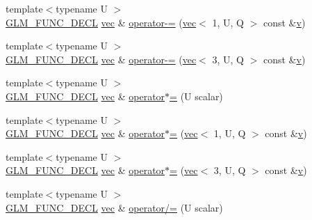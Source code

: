 \begin{DoxyCompactItemize}
\item 
{\footnotesize template$<$typename U $>$ }\\\hyperlink{setup_8hpp_ab2d052de21a70539923e9bcbf6e83a51}{G\+L\+M\+\_\+\+F\+U\+N\+C\+\_\+\+D\+E\+CL} \hyperlink{structglm_1_1vec}{vec} \& \hyperlink{structglm_1_1vec_3_013_00_01_t_00_01_q_01_4_a9b8dba9adb57ad50b1f22fdf3864407e}{operator-\/=} (\hyperlink{structglm_1_1vec}{vec}$<$ 1, U, Q $>$ const \&\hyperlink{_s_d_l__opengl_8h_a10a82eabcb59d2fcd74acee063775f90}{v})
\item 
{\footnotesize template$<$typename U $>$ }\\\hyperlink{setup_8hpp_ab2d052de21a70539923e9bcbf6e83a51}{G\+L\+M\+\_\+\+F\+U\+N\+C\+\_\+\+D\+E\+CL} \hyperlink{structglm_1_1vec}{vec} \& \hyperlink{structglm_1_1vec_3_013_00_01_t_00_01_q_01_4_af172872e811a8262f44dc83a9784354e}{operator-\/=} (\hyperlink{structglm_1_1vec}{vec}$<$ 3, U, Q $>$ const \&\hyperlink{_s_d_l__opengl_8h_a10a82eabcb59d2fcd74acee063775f90}{v})
\item 
{\footnotesize template$<$typename U $>$ }\\\hyperlink{setup_8hpp_ab2d052de21a70539923e9bcbf6e83a51}{G\+L\+M\+\_\+\+F\+U\+N\+C\+\_\+\+D\+E\+CL} \hyperlink{structglm_1_1vec}{vec} \& \hyperlink{structglm_1_1vec_3_013_00_01_t_00_01_q_01_4_aba701d21d6bd3d13abf30c01af0578a5}{operator$\ast$=} (U scalar)
\item 
{\footnotesize template$<$typename U $>$ }\\\hyperlink{setup_8hpp_ab2d052de21a70539923e9bcbf6e83a51}{G\+L\+M\+\_\+\+F\+U\+N\+C\+\_\+\+D\+E\+CL} \hyperlink{structglm_1_1vec}{vec} \& \hyperlink{structglm_1_1vec_3_013_00_01_t_00_01_q_01_4_ab92a53416987503f1fcf90654e0512fd}{operator$\ast$=} (\hyperlink{structglm_1_1vec}{vec}$<$ 1, U, Q $>$ const \&\hyperlink{_s_d_l__opengl_8h_a10a82eabcb59d2fcd74acee063775f90}{v})
\item 
{\footnotesize template$<$typename U $>$ }\\\hyperlink{setup_8hpp_ab2d052de21a70539923e9bcbf6e83a51}{G\+L\+M\+\_\+\+F\+U\+N\+C\+\_\+\+D\+E\+CL} \hyperlink{structglm_1_1vec}{vec} \& \hyperlink{structglm_1_1vec_3_013_00_01_t_00_01_q_01_4_a6ac07056cd1518270e77cdcce4fb3fe5}{operator$\ast$=} (\hyperlink{structglm_1_1vec}{vec}$<$ 3, U, Q $>$ const \&\hyperlink{_s_d_l__opengl_8h_a10a82eabcb59d2fcd74acee063775f90}{v})
\item 
{\footnotesize template$<$typename U $>$ }\\\hyperlink{setup_8hpp_ab2d052de21a70539923e9bcbf6e83a51}{G\+L\+M\+\_\+\+F\+U\+N\+C\+\_\+\+D\+E\+CL} \hyperlink{structglm_1_1vec}{vec} \& \hyperlink{structglm_1_1vec_3_013_00_01_t_00_01_q_01_4_aa4bc81071af6afd97fa02aabcb50d30a}{operator/=} (U scalar)

\end{DoxyCompactItemize}
